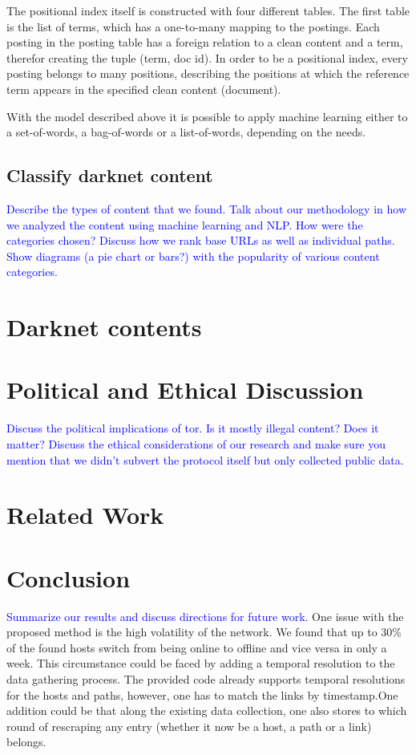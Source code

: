 \documentclass[USenglish,oneside,twocolumn]{article}
\newcommand\CONTENT[1]{\textcolor{blue}{#1}}
\begin{document}
The positional index itself is constructed with four different tables. The first table is the list of terms, which has a one-to-many mapping to the postings. Each posting in the posting table has a foreign relation to a clean content and a term, therefor creating the tuple (term, doc id). In order to be a positional index, every posting belongs to many positions, describing the positions at which the reference term appears in the specified clean content (document).

With the model described above it is possible to apply machine learning either to a set-of-words, a bag-of-words or a list-of-words, depending on the needs.

\subsection{Classify darknet content}


\CONTENT{Describe the types of content that we found. Talk about our methodology in how we analyzed the content using machine learning and NLP. How were the categories chosen? Discuss how we rank base URLs as well as individual paths. Show diagrams (a pie chart or bars?) with the popularity of various content categories.}

\section{Darknet contents}

\section{Political and Ethical Discussion}

\CONTENT{Discuss the political implications of tor. Is it mostly illegal content? Does it matter? Discuss the ethical considerations of our research and make sure you mention that we didn’t subvert the protocol itself but only collected public data.}

\section{Related Work}

\section{Conclusion}

\CONTENT{Summarize our results and discuss directions for future work.}
One issue with the proposed method is the high volatility of the network. We found that up to 30\% of the found hosts switch from being online to offline and vice versa in only a week. This circumstance could be faced by adding a temporal resolution to the data gathering process.
The provided code already supports temporal resolutions for the hosts and paths, however, one has to match the links by timestamp.One addition could be that along the existing data collection, one also stores to which round of rescraping any entry (whether it now be a host, a path or a link) belongs.
\end{document}

